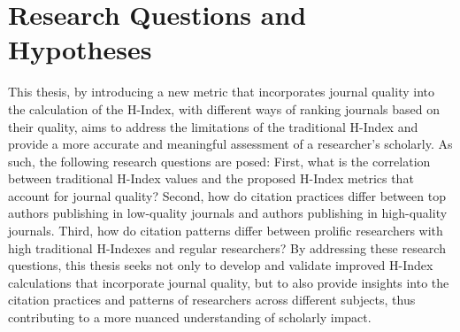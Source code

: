 \section{Research Questions and Hypotheses}
This thesis, by introducing a new metric that incorporates journal quality into
the calculation of the H-Index, with different ways of ranking journals based
on their quality, aims to address the limitations of the traditional H-Index
and provide a more accurate and meaningful assessment of a researcher's
scholarly. As such, the following research questions are posed: First, what is
the correlation between traditional H-Index values and the proposed H-Index
metrics that account for journal quality? Second, how do citation practices
differ between top authors publishing in low-quality journals and authors
publishing in high-quality journals. Third, how do citation patterns differ
between prolific researchers with high traditional H-Indexes and regular
researchers? By addressing these research questions, this thesis seeks not only
to develop and validate improved H-Index calculations that incorporate journal
quality, but to also provide insights into the citation practices and patterns
of researchers across different subjects, thus contributing to a more nuanced
understanding of scholarly impact.
